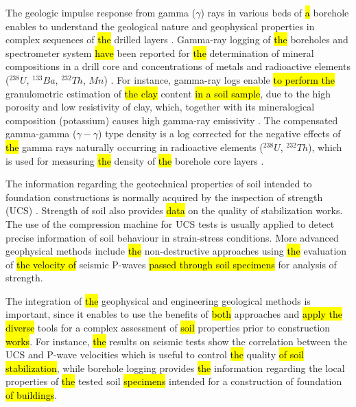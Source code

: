 \documentclass[USenglish,twocolumn]{article}
\begin{document}
The geologic impulse response from gamma ($\gamma$) rays in various beds of \hl{a }borehole enables to understand the geological nature and geophysical properties in complex sequences of \hl{the }drilled layers \cite{Conaway}. Gamma-ray logging of \hl{the }boreholes and spectrometer system \hl{have} been reported for \hl{the }determination of mineral compositions in a drill core \cite{Ajayi} and concentrations of metals and radioactive elements ($^{238}U$, $^{133}Ba$, $^{232}Th$, $Mn$) \cite{Loevborg,Mikesell}. For instance, gamma-ray logs enable \hl{to perform the }granulometric estimation of \hl{the clay} content \hl{in a soil sample}, due to the high porosity and low resistivity of clay, which, together with its mineralogical composition (potassium) causes high gamma-ray emissivity \cite{Bhuyan,DIAZCURIEL2021104481}. The compensated gamma-gamma ($\gamma-\gamma$) type density is a log corrected for the negative effects of \hl{the }gamma rays naturally occurring in radioactive elements ($^{238}U$, $^{232}Th$), which is used for measuring \hl{the }density of \hl{the }borehole core layers \cite{osti_5961810,osti_5614551}.

The information regarding the geotechnical properties of soil intended to foundation constructions is normally acquired by the inspection of strength (UCS) \cite{LindhWinter,Lemenkov2021b,Lemenkov2021a}. Strength of soil also provides \hl{data} on the quality of stabilization works. The use of the compression machine for UCS tests is usually applied to detect precise information of soil behaviour in strain-stress conditions. More advanced geophysical methods include \hl{the }non-destructive approaches using \hl{the }evaluation of \hl{the velocity of }seismic P-waves \hl{passed through soil specimens} for analysis of strength. 

The integration of \hl{the }geophysical and engineering geological methods is important, since it enables to use the benefits of \hl{both} approaches and \hl{apply the diverse }tools for a complex assessment of \hl{soil} properties prior to construction \hl{works}. For instance, \hl{the }results on seismic tests show the correlation between the UCS and P-wave velocities which is useful to control \hl{the }quality \hl{of soil stabilization}, while borehole logging provides \hl{the} information regarding the local properties of \hl{the }tested soil \hl{specimens }intended for a construction of foundation \hl{of buildings}.
\end{document}

